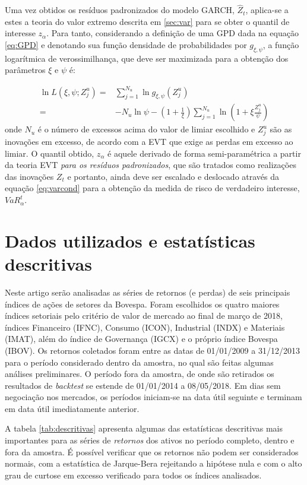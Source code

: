 \documentclass[1p]{elsarticle}
\theoremstyle{definition}
\begin{document}
Uma vez obtidos os resíduos padronizados do modelo GARCH, $\hat{Z}_t$, aplica-se a estes a teoria do valor extremo descrita em \ref{sec:var} para se obter o quantil de interesse $z_\alpha$. Para tanto, considerando a definição de uma GPD dada na equação \eqref{eq:GPD} e denotando sua função densidade de probabilidades por $g_{\xi, \psi}$, a função logarítmica de verossimilhança, que deve ser maximizada para a obtenção dos parâmetros $\xi$ e $\psi$ é:

\begin{align}
\label{eq:gpdloglik}
\ln L(\xi, \psi; Z^u_j)=&\sum\limits_{j=1}^{N_u}\ln g_{\xi, \psi}(Z^u_j)\nonumber\\
					   =&-N_u \ln \psi-\left(1+\frac{1}{\xi}\right)\sum\limits_{j=1}^{N_u}\ln \left(1+\xi\frac{Z^u_j}{\psi}\right) 
\end{align}
onde $N_u$ é o número de excessos acima do valor de limiar escolhido e $Z^u_j$ são as inovações em excesso, de acordo com a EVT que exige as perdas em excesso ao limiar. O quantil obtido, $z_\alpha$ é aquele derivado de forma semi-paramétrica a partir da teoria EVT \emph{para os resíduos padronizados}, que são tratados como realizações das inovações $Z_t$ e portanto, ainda deve ser escalado e deslocado através da equação \eqref{eq:varcond} para a obtenção da medida de risco de verdadeiro interesse, $VaR_\alpha^t$.

\section{Dados utilizados e estatísticas descritivas}
\label{sec:descritivas}

Neste artigo serão analisadas as séries de retornos (e perdas) de seis principais índices de ações de setores da Bovespa. Foram escolhidos os quatro maiores índices setoriais pelo critério de valor de mercado ao final de março de 2018, índices Financeiro (IFNC), Consumo (ICON), Industrial (INDX) e Materiais (IMAT), além do índice de Governança (IGCX) e o próprio índice Bovespa (IBOV). Os retornos coletados foram entre as datas de 01/01/2009 a 31/12/2013 para o período considerado dentro da amostra, no qual são feitas algumas análises preliminares. O período fora da amostra, de onde são retirados os resultados de \emph{backtest} se estende de 01/01/2014 a 08/05/2018. Em dias sem negociação nos mercados, os períodos iniciam-se na data útil seguinte e terminam em data útil imediatamente anterior.

A tabela \ref{tab:descritivas} apresenta algumas das estatísticas descritivas mais importantes para as séries de \emph{retornos} dos ativos no período completo, dentro e fora da amostra. É possível verificar que os retornos não podem ser considerados normais, com a estatística de Jarque-Bera rejeitando a hipótese nula e com o alto grau de curtose em excesso verificado para todos os índices analisados.
\end{document}
